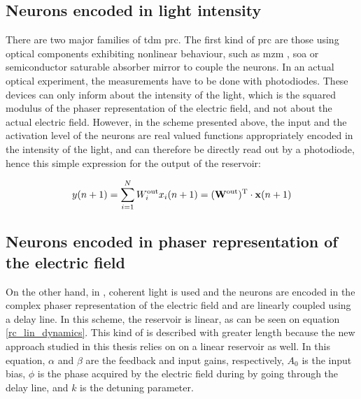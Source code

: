 
\subsection{Neurons encoded in light intensity}

There are two major families of \gls{tdm} \gls{prc}. The first kind of \gls{prc} are those using optical components exhibiting nonlinear behaviour, such as \gls{mzm} \cite{Duport2016, Paquot2012, Antonik2017}, \gls{soa} \cite{Vandoorne2008} or semiconductor saturable absorber mirror \cite{Dejonckheere2014} to couple the neurons. In an actual optical experiment, the measurements have to be done with photodiodes. These devices can only inform about the intensity of the light, which is the squared modulus of the phaser representation of the electric field, and not about the actual electric field. However, in the scheme presented above, the input and the activation level of the neurons are real valued functions appropriately encoded in the intensity of the light, and can therefore be directly read out by a photodiode, hence this simple expression for the output of the reservoir:

\begin{equation}
	y(n+1) = \sum_{i=1}^{N} W^{\text{out}}_i x_i (n+1) = (\mathbf{W}^{\text{out}})^{\text{T}} \cdot \mathbf{x}(n+1)
	\label{lin_output_rc}
\end{equation}


\subsection{Neurons encoded in phaser representation of the electric field}

\label{rc-lin-complex}

On the other hand, in \cite{Vinckier2015}, coherent light is used and the neurons are encoded in the complex phaser representation of the electric field and are linearly coupled using a delay line. In this scheme, the reservoir is linear, as can be seen on equation \eqref{rc_lin_dynamics}. This kind of \rcer is described with greater length because the new approach studied in this thesis relies on on a linear reservoir as well. In this equation, $\alpha$ and $\beta$ are the feedback and input gains, respectively, $A_0$ is the input bias, $\phi$ is the phase acquired by the electric field during by going through the delay line, and $k$ is the detuning parameter.

